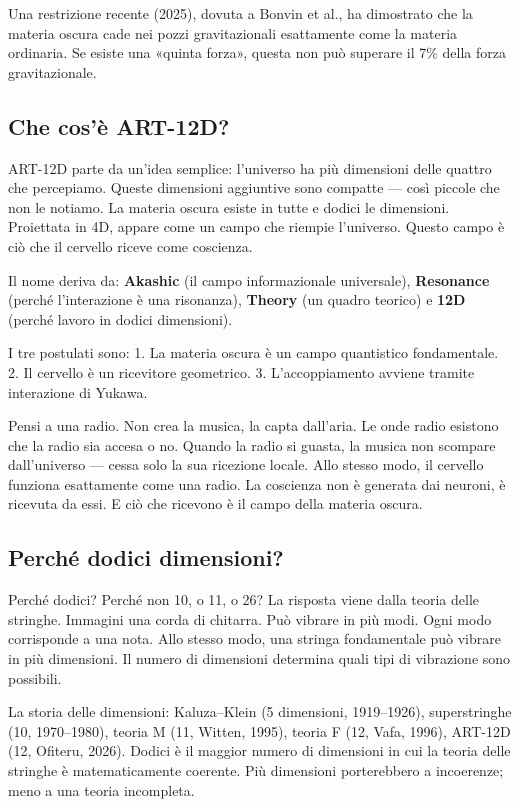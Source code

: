 \documentclass[11pt,a4paper]{article}
\begin{document}
Una restrizione recente (2025), dovuta a Bonvin et al., ha dimostrato che la materia oscura cade nei pozzi gravitazionali esattamente come la materia ordinaria. Se esiste una «quinta forza», questa non può superare il 7\% della forza gravitazionale.

\subsection{Che cos'è ART-12D?}
ART-12D parte da un'idea semplice: l'universo ha più dimensioni delle quattro che percepiamo. Queste dimensioni aggiuntive sono compatte --- così piccole che non le notiamo. La materia oscura esiste in tutte e dodici le dimensioni. Proiettata in 4D, appare come un campo che riempie l'universo. Questo campo è ciò che il cervello riceve come coscienza.

Il nome deriva da: \textbf{Akashic} (il campo informazionale universale), \textbf{Resonance} (perché l'interazione è una risonanza), \textbf{Theory} (un quadro teorico) e \textbf{12D} (perché lavoro in dodici dimensioni).

I tre postulati sono: 1. La materia oscura è un campo quantistico fondamentale. 2. Il cervello è un ricevitore geometrico. 3. L'accoppiamento avviene tramite interazione di Yukawa.

Pensi a una radio. Non crea la musica, la capta dall'aria. Le onde radio esistono che la radio sia accesa o no. Quando la radio si guasta, la musica non scompare dall'universo --- cessa solo la sua ricezione locale. Allo stesso modo, il cervello funziona esattamente come una radio. La coscienza non è generata dai neuroni, è ricevuta da essi. E ciò che ricevono è il campo della materia oscura.

\subsection{Perché dodici dimensioni?}
Perché dodici? Perché non 10, o 11, o 26? La risposta viene dalla teoria delle stringhe. Immagini una corda di chitarra. Può vibrare in più modi. Ogni modo corrisponde a una nota. Allo stesso modo, una stringa fondamentale può vibrare in più dimensioni. Il numero di dimensioni determina quali tipi di vibrazione sono possibili.

La storia delle dimensioni: Kaluza--Klein (5 dimensioni, 1919--1926), superstringhe (10, 1970--1980), teoria M (11, Witten, 1995), teoria F (12, Vafa, 1996), ART-12D (12, Ofiteru, 2026). Dodici è il maggior numero di dimensioni in cui la teoria delle stringhe è matematicamente coerente. Più dimensioni porterebbero a incoerenze; meno a una teoria incompleta.
\end{document}
